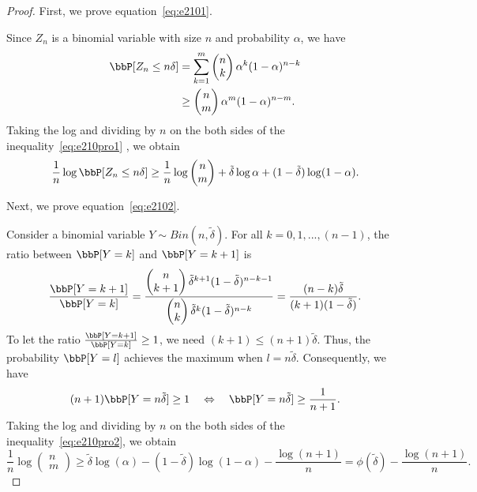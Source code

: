 \documentclass[11pt]{article}
\theoremstyle{plain}
\theoremstyle{definition}
\begin{document}
\begin{proof}
	First, we prove equation~\eqref{eq:e2101}.
	
	\vspace{0.2cm}
	Since $Z_n$ is a binomial variable with size $n$ and probability $\alpha$, we have
	\begin{align}
		\bbP[Z_n \leq n\delta ] &= \sum_{k = 1}^m \begin{pmatrix}
			n \\ k
		\end{pmatrix} \alpha^k (1-\alpha)^{n - k}\\
		& \geq \begin{pmatrix}
			n \\ m
		\end{pmatrix} \alpha^m (1-\alpha)^{n - m}. \label{eq:e210pro1}
	\end{align}
	Taking the log and dividing by $n$ on the both sides of the inequality~\eqref{eq:e210pro1} , we obtain
	\[ \frac{1}{n} \log \bbP[Z_n \leq n\delta ] \geq \frac{1}{n} \log \begin{pmatrix}
			n \\ m		\end{pmatrix} + \tilde \delta \log \alpha + (1 - \tilde \delta ) \log (1-\alpha). \]
			
	\vspace{0.2cm}
	Next, we prove equation~\eqref{eq:e2102}.
	
	\vspace{0.2cm}
	Consider a binomial variable $Y \sim Bin(n,\tilde \delta)$. For all $k = 0,1,...,(n-1)$, the ratio between $\bbP[Y = k]$ and $\bbP[Y = k+1]$ is
	\begin{equation}
		\frac{\bbP[Y = k+1]}{\bbP[Y = k]} = \frac{\begin{pmatrix}
			n \\ k+1
		\end{pmatrix} \tilde \delta^{k+1} (1-\tilde \delta)^{n - k -1} }{\begin{pmatrix}
			n \\ k
		\end{pmatrix} \tilde \delta^{k} (1-\tilde \delta)^{n - k }} = \frac{(n-k) \tilde \delta}{(k+1) (1- \tilde \delta)  }.
	\end{equation}
	To let the ratio $	\frac{\bbP[Y = k+1]}{\bbP[Y = k]} \geq 1$, we need $(k+1)\leq (n+1) \tilde \delta $. Thus, the probability $\bbP[Y = l]$ achieves the maximum when $l = n \tilde \delta$. Consequently, we have
	\begin{equation}\label{eq:e210pro2}
		(n+1) \bbP[Y = n \tilde \delta] \geq 1 \quad \Leftrightarrow \quad  \bbP[Y = n \tilde \delta] \geq \frac{1}{n+1}.
	\end{equation}
	Taking the log and dividing by $n$ on the both sides of the inequality~\eqref{eq:e210pro2}, we obtain
	\begin{equation}
		 \frac{1}{n} \log \begin{pmatrix}
			n \\ m		\end{pmatrix} \geq \tilde \delta \log(\alpha) - (1 - \tilde \delta)\log(1 - \alpha) - \frac{\log(n+1)}{n} = \phi(\tilde \delta)  - \frac{\log(n+1)}{n}.
	\end{equation}
	

\end{proof}
\end{document}
